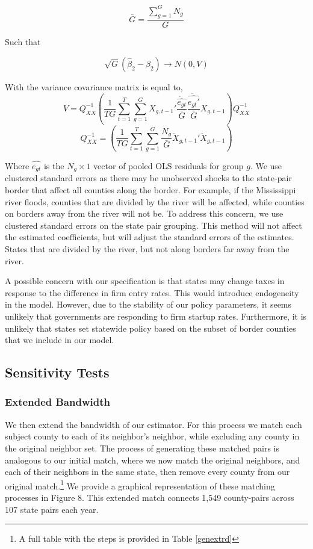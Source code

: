 \begin{equation}
\bar G = \frac{\sum_{g=1}^{G}N_{g}}{G}
\end{equation}

Such that

$$\sqrt{G}(\hat \beta_{2} - \beta_{2}) \to N(0,V)$$

With the variance covariance matrix is equal to,
\begin{equation} V = Q_{XX}^{-1}\left(\frac{1}{TG}\sum_{t=1}^{T}\sum_{g=1}^{G}X_{g,t-1}'\frac{\ddot{\hat{e_{gt}}}}{\bar G}\frac{\ddot{\hat{e_{gt}'}}}{\bar G}X_{g,t-1}\right)Q_{XX}^{-1} \end{equation}
$$ Q_{XX}^{-1} = \left(\frac{1}{TG} \sum_{t=1}^{T}\sum_{g=1}^{G}\frac{N_{g}}{\bar G}\ddot X_{g,t-1}'\ddot X_{g,t-1}\right) $$

Where $\hat{\ddot{e_{gt}}}$ is the $N_{g} \times 1$ vector of pooled OLS residuals for group $g$. We use clustered standard errors as there may be unobserved shocks to the state-pair border that affect all counties along the border.  For example, if the Mississippi river floods, counties that are divided by the river will be affected, while counties on borders away from the river will not be. To address this concern, we use clustered standard errors on the state pair grouping.  This method will not affect the estimated coefficients, but will adjust the standard errors of the estimates. States that are divided by the river, but not along borders far away from the river.

A possible concern with our specification is that states may change taxes in response to the difference in firm entry rates.  This would introduce endogeneity in the model.  However, due to the stability of our policy parameters, it seems unlikely that governments are responding to firm startup rates.  Furthermore, it is unlikely that states set statewide policy based on the subset of border  counties that we include in our model.

\subsection{Sensitivity Tests}

\subsubsection{Extended Bandwidth}

We then extend the bandwidth of our estimator. For this process we match each subject county to each of its neighbor’s neighbor, while excluding any county in the original neighbor set. The process of generating these matched pairs is analogous to our initial match, where we now match the original neighbors, and each of their neighbors in the same state, then remove every county from our original match.\footnote{A full table with the steps is provided in Table \ref{genextrd}} We provide a graphical representation of these matching processes in Figure 8. This extended match connects 1,549 county-pairs across 107 state pairs each year. 

